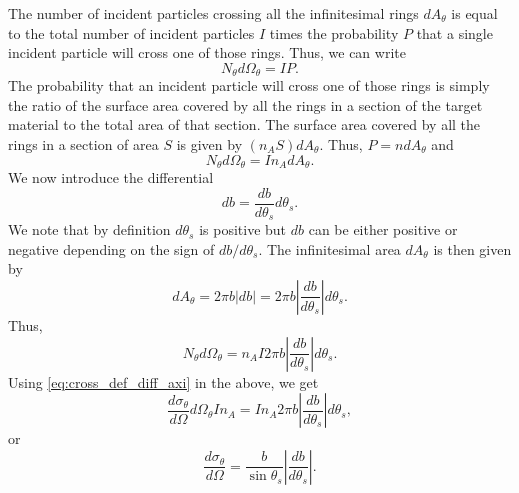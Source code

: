 \documentclass[a4paper,11pt]{report}
\begin{document}
The number of incident particles crossing all the infinitesimal rings $dA_\theta$ is equal to the total number of incident particles $I$ times the probability $P$ that a single incident particle will cross one of those rings. Thus, we can write
\begin{equation*}
    N_\theta d\Omega_\theta = I P.
\end{equation*}
The probability that an incident particle will cross one of those rings is simply the ratio of the surface area covered by all the rings in a section of the target material to the total area of that section. The surface area covered by all the rings in a section of area $S$ is given by $(n_A S) dA_\theta$. Thus, $P = ndA_\theta$ and 
\begin{equation*}
    N_\theta d\Omega_\theta = I n_A dA_\theta.
\end{equation*}
We now introduce the differential 
\begin{equation}
    \label{eq:cross_impact_differential}
    db = \frac{db}{d\theta_s} d\theta_s.
\end{equation}
We note that by definition $d\theta_s$ is positive but $db$ can be either positive or negative depending on the sign of $db/d\theta_s$. The infinitesimal area $dA_\theta$ is then given by 
\begin{equation}
    \label{eq:cross_impact_area}
    dA_\theta= 2\pi b |db| = 2 \pi b \left | \frac{db}{d\theta_s} \right | d \theta_s.
\end{equation}
Thus, 
\begin{equation*}
    N_\theta d\Omega_\theta = n_A I 2 \pi b \left | \frac{db}{d\theta_s} \right | d \theta_s.
\end{equation*}
Using \cref{eq:cross_def_diff_axi} in the above, we get
\begin{equation*}
    \frac{d\sigma_\theta}{d\Omega} d\Omega_\theta I n_A = I n_A 2 \pi b \left | \frac{db}{d\theta_s} \right | d \theta_s, 
\end{equation*}
or 
\begin{equation}
    \label{eq:cross_diff_impact_axi}
    \frac{d\sigma_\theta}{d\Omega} = \frac{b}{\sin \theta_s} \left | \frac{db}{d\theta_s} \right |.
\end{equation}

\end{document}
